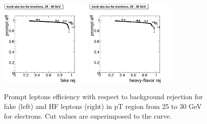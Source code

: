 \begin{figure}[htbp]
\begin{center}
 \includegraphics[width = 0.4\textwidth]{pictures/bkgdRej_sigEff/onlyTrack_elec_fake_ptCut4_ptCut5.png}
\includegraphics[width = 0.4\textwidth]{pictures/bkgdRej_sigEff/onlyTrack_elec_nonPrompt_ptCut4_ptCut5.png}
\caption{\small{Prompt leptons efficiency with respect to background 
rejection for fake (left) and HF leptons (right) in pT region
from 25 to 30 GeV for electrons. 
Cut values are superimposed to the curve.}\label{fig:rej_el5}}
\end{center}
\end{figure}


